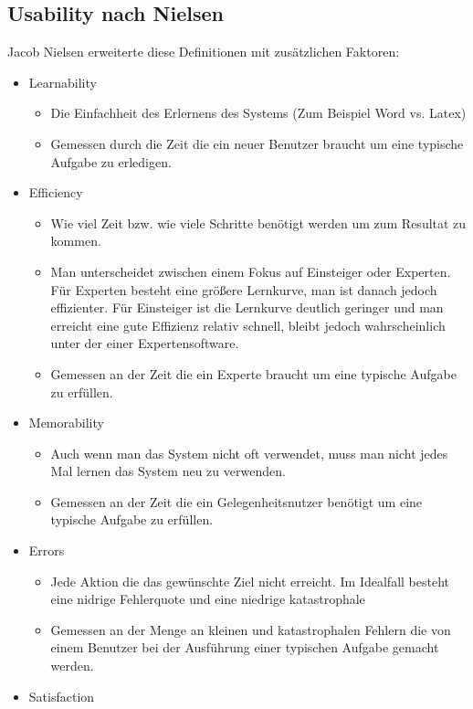 \documentclass{article}
\begin{document}
	\subsection{Usability nach Nielsen}
	Jacob Nielsen erweiterte diese Definitionen mit zusätzlichen Faktoren:
	\begin{itemize}
		\item{Learnability}
		\begin{itemize}
			\item{Die Einfachheit des Erlernens des Systems (Zum Beispiel Word vs. Latex)}
			\item{Gemessen durch die Zeit die ein neuer Benutzer braucht um eine typische Aufgabe zu erledigen.}
		\end{itemize}
		\item{Efficiency}
		\begin{itemize}
			\item{Wie viel Zeit bzw. wie viele Schritte benötigt werden um zum Resultat zu kommen.}
			\item{Man unterscheidet zwischen einem Fokus auf Einsteiger oder Experten. Für Experten besteht eine größere Lernkurve, man ist danach jedoch effizienter. Für Einsteiger ist die Lernkurve deutlich geringer und man erreicht eine gute Effizienz relativ schnell, bleibt jedoch wahrscheinlich unter der einer Expertensoftware.}
			\item{Gemessen an der Zeit die ein Experte braucht um eine typische Aufgabe zu erfüllen.}
		\end{itemize}
		\item{Memorability}
		\begin{itemize}
			\item{Auch wenn man das System nicht oft verwendet, muss man nicht jedes Mal lernen das System neu zu verwenden.}
			\item{Gemessen an der Zeit die ein Gelegenheitsnutzer benötigt um eine typische Aufgabe zu erfüllen.}
		\end{itemize}
		\item{Errors}
		\begin{itemize}
			\item{Jede Aktion die das gewünschte Ziel nicht erreicht. Im Idealfall besteht eine nidrige Fehlerquote und eine niedrige katastrophale }
			\item{Gemessen an der Menge an kleinen und katastrophalen Fehlern die von einem Benutzer bei der Ausführung einer typischen Aufgabe gemacht werden.}
		\end{itemize}
		\item{Satisfaction}

\end{itemize}
\end{document}
